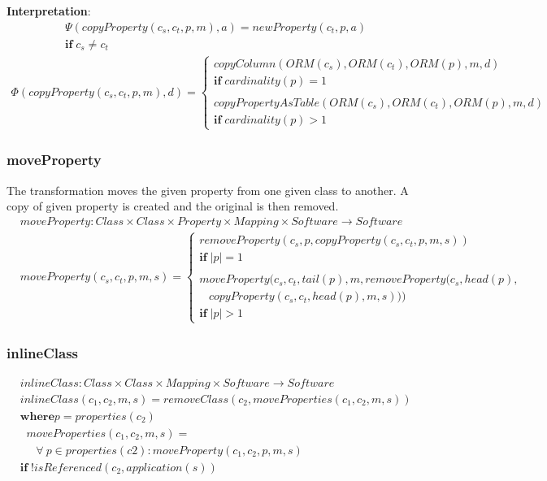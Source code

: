 \documentclass[10pt]{article}
\begin{document}
\noindent \textbf{Interpretation}:
\begin{align}
& \Psi(copyProperty(c_s, c_t, p, m), a) = newProperty(c_t, p, a)  \nonumber \\
& \mathbf{if} \; c_s \neq c_t
\end{align}
\begin{align}
\Phi(copyProperty(c_s, c_t, p, m), d) = \begin{cases}
 copyColumn(ORM(c_s), ORM(c_t), ORM(p), m, d) \\
 \mathbf{if} \; cardinality(p) = 1  \\\\
 copyPropertyAsTable(ORM(c_s), ORM(c_t), ORM(p), m, d) \\ 
 \mathbf{if} \; cardinality(p) > 1
 \end{cases}
\end{align}

\subsubsection{moveProperty}
The transformation moves the given property from one given class to another. A copy of given property is created and the original is then removed.
\begin{align}
& moveProperty: Class \times Class \times Property \times Mapping \times Software \rightarrow Software \\
& moveProperty(c_s, c_t, p, m, s) = \begin{cases}
removeProperty(c_s, p, copyProperty(c_s, c_t, p, m, s)) \\
\mathbf{if} \; |p| = 1 \\\\
moveProperty(c_s, c_t, tail(p), m, removeProperty(c_s, head(p), \\ \;\;\; copyProperty(c_s, c_t, head(p), m, s))) \\ 
\mathbf{if} \; |p| > 1
 \end{cases}
\end{align}

\subsubsection{inlineClass}
\begin{align}
& inlineClass:  Class \times Class \times Mapping \times Software \rightarrow Software \\
& inlineClass(c_1, c_2, m, s) = removeClass(c_2, moveProperties(c_1, c_2, m, s)) \\
& \mathbf{where} p =  properties(c_2) \nonumber \\ 
& \;\; moveProperties(c_1, c_2, m, s) = \nonumber \\
& \;\; \;\;\; \forall \: p \in properties(c2) : moveProperty(c_1, c_2, p, m, s) \nonumber \\
& \mathbf{if} \; !isReferenced(c_2, application(s))
\end{align}
\end{document}
